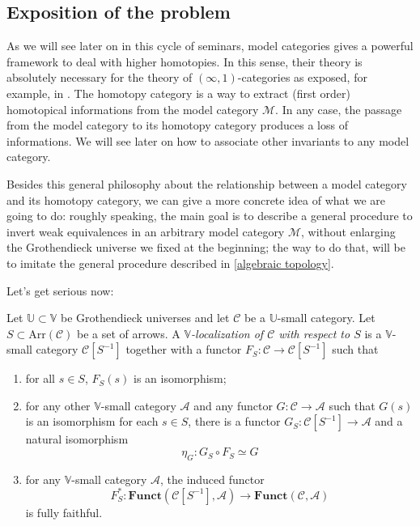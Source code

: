 \begin{refsection}
\subsection{Exposition of the problem}

As we will see later on in this cycle of seminars, model categories gives a powerful framework to deal with higher homotopies. In this sense, their theory is absolutely necessary for the theory of $(\infty,1)$-categories as exposed, for example, in \cite{htt}. The homotopy category is a way to extract (first order) homotopical informations from the model category $\mathcal M$. In any case, the passage from the model category to its homotopy category produces a loss of informations. We will see later on how to associate other invariants to any model category.

Besides this general philosophy about the relationship between a model category and its homotopy category, we can give a more concrete idea of what we are going to do: roughly speaking, the main goal is to describe a general procedure to invert weak equivalences in an arbitrary model category $\mathcal M$, without enlarging the Grothendieck universe we fixed at the beginning; the way to do that, will be to imitate the general procedure described in \ref{algebraic topology}.

Let's get serious now:

\begin{defin} \label{def localization}
Let $\mathbb U \subset \mathbb V$ be Grothendieck universes and let $\mathcal C$ be a $\mathbb U$-small category. Let $S \subset \mathrm{Arr}(\mathcal C)$ be a set of arrows. A \emph{$\mathbb V$-localization of $\mathcal C$ with respect to $S$} is a $\mathbb V$-small category $\mathcal C[S^{-1}]$ together with a functor $F_S \colon \mathcal C \to \mathcal C[S^{-1}]$ such that
\begin{enumerate}
\item for all $s \in S$, $F_S(s)$ is an isomorphism;
\item for any other $\mathbb V$-small category $\mathcal A$ and any functor $G \colon \mathcal C \to \mathcal A$ such that $G(s)$ is an isomorphism for each $s \in S$, there is a functor $G_S \colon \mathcal C[S^{-1}] \to \mathcal A$ and a natural isomorphism
\[
\eta_G \colon G_S \circ F_S \simeq G
\]
\item for any $\mathbb V$-small category $\mathcal A$, the induced functor
\[
F_S^* \colon \mathbf{Funct}(\mathcal C[S^{-1}],\mathcal A) \to \mathbf{Funct}(\mathcal C, \mathcal A)
\]
is fully faithful.
\end{enumerate}
\end{defin}


\end{refsection}
